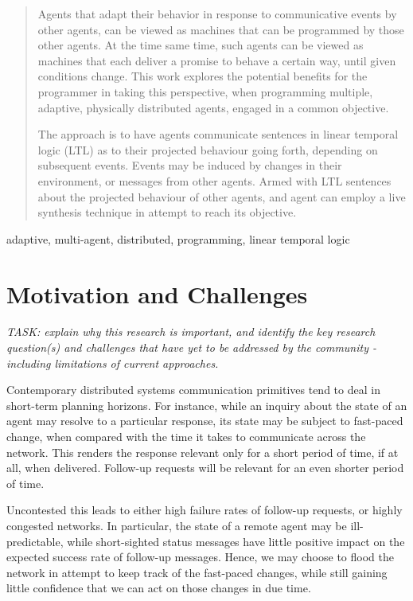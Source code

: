 \documentclass[conference]{IEEEtran}
\begin{document}
\begin{abstract}


Agents that adapt their behavior in response to communicative events
by other agents, can be viewed as machines that can be programmed by
those other agents. At the time same time, such agents can be viewed
as machines that each deliver a promise to behave a certain way, until
given conditions change. This work explores the potential benefits for
the programmer in taking this perspective, when programming multiple,
adaptive, physically distributed agents, engaged in a common
objective.

The approach is to have agents communicate sentences in linear
temporal logic (LTL) as to their projected behaviour going forth,
depending on subsequent events. Events may be induced by changes in
their environment, or messages from other agents. Armed with LTL
sentences about the projected behaviour of other agents, and agent can
employ a live synthesis technique in attempt to reach its objective.

\end{abstract}

\begin{IEEEkeywords}
adaptive, multi-agent, distributed, programming, linear temporal logic
\end{IEEEkeywords}

\section{Motivation and Challenges}

\emph{TASK: explain why this research is important, and identify the
key research question(s) and challenges that have yet to be addressed
by the community - including limitations of current approaches.}

Contemporary distributed systems communication primitives tend to deal
in short-term planning horizons. For instance, while an inquiry about
the state of an agent may resolve to a particular response, its state
may be subject to fast-paced change, when compared with the time it
takes to communicate across the network. This renders the response
relevant only for a short period of time, if at all, when delivered.
Follow-up requests will be relevant for an even shorter period of
time.

Uncontested this leads to either high failure rates of follow-up
requests, or highly congested networks. In particular, the state of a
remote agent may be ill-predictable, while short-sighted status
messages have little positive impact on the expected success rate of
follow-up messages. Hence, we may choose to flood the network in
attempt to keep track of the fast-paced changes, while still gaining
little confidence that we can act on those changes in due time.
\end{document}
